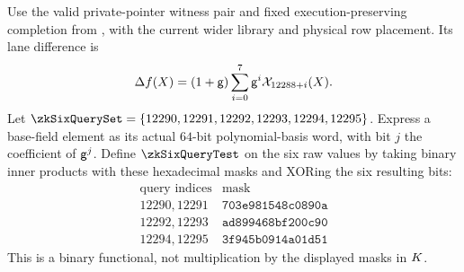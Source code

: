 Use the valid private-pointer witness pair and fixed execution-preserving completion from , with the current wider library and physical row placement. Its lane difference is
\[
 \Delta f(X)=(1+\mathsf{g})\sum_{i=0}^7\mathsf{g}^i\mathcal{X}_{12288+i}(X).
\]
Let $\zkSixQuerySet=\{12290,12291,12292,12293,12294,12295\}$. Express a base-field element as its actual $64$-bit polynomial-basis word, with bit $j$ the coefficient of $\mathsf{g}^j$. Define $\zkSixQueryTest$ on the six raw values by taking binary inner products with these hexadecimal masks and XORing the six resulting bits:
\[
 \begin{array}{c|c}
 \text{query indices}&\text{mask}\\ \hline
 12290,12291&\texttt{703e981548c0890a}\\
 12292,12293&\texttt{ad899468bf200c90}\\
 12294,12295&\texttt{3f945b0914a01d51}
 \end{array}
\]
This is a binary functional, not multiplication by the displayed masks in $K$.

